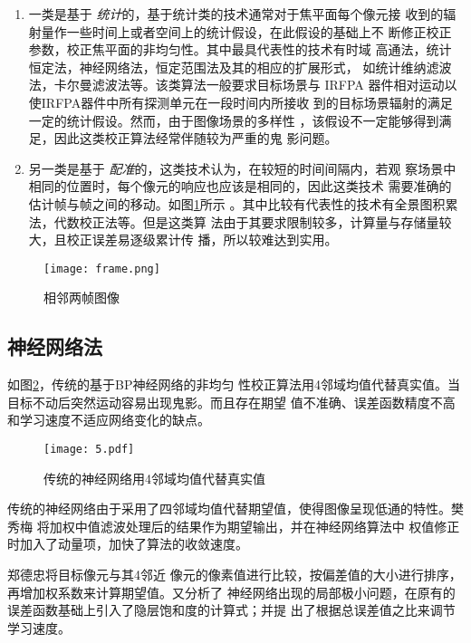 \documentclass[../main]{subfiles}
\begin{document}
\begin{enumerate}

	\item 一类是基于 \emph{统计}的，基于统计类的技术通常对于焦平面每个像元接
		收到的辐射量作一些时间上或者空间上的统计假设，在此假设的基础上不
		断修正校正参数，校正焦平面的非均匀性。其中最具代表性的技术有时域
		高通法，统计恒定法，神经网络法，恒定范围法及其的相应的扩展形式，
		如统计维纳滤波法，卡尔曼滤波法等。该类算法一般要求目标场景与
		IRFPA 器件相对运动以使IRFPA器件中所有探测单元在一段时间内所接收
		到的目标场景辐射的满足一定的统计假设。然而，由于图像场景的多样性
		，该假设不一定能够得到满足，因此这类校正算法经常伴随较为严重的鬼
		影问题。

	\item 另一类是基于 \emph{配准}的，这类技术认为，在较短的时间间隔内，若观
		察场景中相同的位置时，每个像元的响应也应该是相同的，因此这类技术
		需要准确的估计帧与帧之间的移动。如图\ref{fig:相邻两帧图像}所示
		。其中比较有代表性的技术有全景图积累法，代数校正法等。但是这类算
		法由于其要求限制较多，计算量与存储量较大，且校正误差易逐级累计传
		播，所以较难达到实用。

\end{enumerate}

\begin{figure}[htbp]
\centering
\texttt{[image: frame.png]}
\caption{相邻两帧图像}
\label{fig:相邻两帧图像}
\end{figure}

\subsection{神经网络法}%
\label{sub:神经网络法}

如图\ref{fig:传统的神经网络用4邻域均值代替真实值}，传统的基于BP神经网络的非均匀
性校正算法用4邻域均值代替真实值。当目标不动后突然运动容易出现鬼影。而且存在期望
值不准确、误差函数精度不高和学习速度不适应网络变化的缺点。

\begin{figure}[htbp]
	\centering
	\texttt{[image: 5.pdf]}
	\caption{传统的神经网络用4邻域均值代替真实值}
	\label{fig:传统的神经网络用4邻域均值代替真实值}
\end{figure}

传统的神经网络由于采用了四邻域均值代替期望值，使得图像呈现低通的特性。樊秀梅
\cite{樊秀梅2010基于}将加权中值滤波处理后的结果作为期望输出，并在神经网络算法中
权值修正时加入了动量项，加快了算法的收敛速度。

郑德忠\cite{郑德忠2010应用于非均匀性校正的改进的神经网络算法}将目标像元与其4邻近
像元的像素值进行比较，按偏差值的大小进行排序，再增加权系数来计算期望值。又分析了
神经网络出现的局部极小问题，在原有的误差函数基础上引入了隐层饱和度的计算式；并提
出了根据总误差值之比来调节学习速度。
\end{document}
